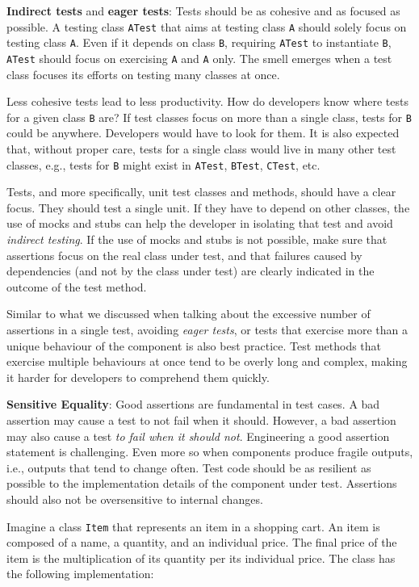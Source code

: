 \textbf{Indirect tests} and \textbf{eager tests}: Tests should be as
cohesive and as focused as possible. A testing class \texttt{ATest} that
aims at testing class \texttt{A} should solely focus on testing class
\texttt{A}. Even if it depends on class \texttt{B}, requiring
\texttt{ATest} to instantiate \texttt{B}, \texttt{ATest} should focus on
exercising \texttt{A} and \texttt{A} only. The smell emerges when a test
class focuses its efforts on testing many classes at once.

Less cohesive tests lead to less productivity. How do developers know
where tests for a given class \texttt{B} are? If test classes focus on
more than a single class, tests for \texttt{B} could be anywhere.
Developers would have to look for them. It is also expected that,
without proper care, tests for a single class would live in many other
test classes, e.g., tests for \texttt{B} might exist in \texttt{ATest},
\texttt{BTest}, \texttt{CTest}, etc.

Tests, and more specifically, unit test classes and methods, should have
a clear focus. They should test a single unit. If they have to depend on
other classes, the use of mocks and stubs can help the developer in
isolating that test and avoid \emph{indirect testing}. If the use of
mocks and stubs is not possible, make sure that assertions focus on the
real class under test, and that failures caused by dependencies (and not
by the class under test) are clearly indicated in the outcome of the
test method.

Similar to what we discussed when talking about the excessive number of
assertions in a single test, avoiding \emph{eager tests}, or tests that
exercise more than a unique behaviour of the component is also best
practice. Test methods that exercise multiple behaviours at once tend to
be overly long and complex, making it harder for developers to
comprehend them quickly.

\textbf{Sensitive Equality}: Good assertions are fundamental in test
cases. A bad assertion may cause a test to not fail when it should.
However, a bad assertion may also cause a test \emph{to fail when it
should not}. Engineering a good assertion statement is challenging. Even
more so when components produce fragile outputs, i.e., outputs that tend
to change often. Test code should be as resilient as possible to the
implementation details of the component under test. Assertions should
also not be oversensitive to internal changes.

Imagine a class \texttt{Item} that represents an item in a shopping
cart. An item is composed of a name, a quantity, and an individual
price. The final price of the item is the multiplication of its quantity
per its individual price. The class has the following implementation:


